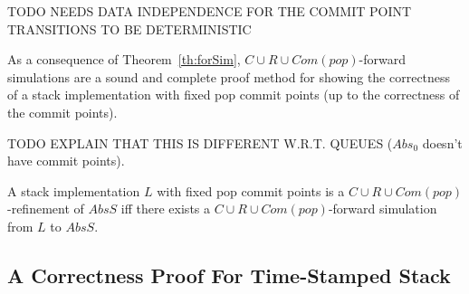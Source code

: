 TODO NEEDS DATA INDEPENDENCE FOR THE COMMIT POINT TRANSITIONS TO BE DETERMINISTIC

As a consequence of Theorem~\ref{th:forSim}, $C\cup R\cup Com(pop)$-forward simulations are a sound and complete proof method for showing the correctness of a stack implementation with fixed pop commit points (up to the correctness of the commit points). 

TODO EXPLAIN THAT THIS IS DIFFERENT W.R.T. QUEUES ($Abs_0$ doesn't have commit points).

\begin{corollary}
A stack implementation $L$ with fixed pop commit points is a $C\cup R\cup Com(pop)$-refinement of $AbsS$ if{f} there exists a $C\cup R\cup Com(pop)$-forward simulation from $L$ to $AbsS$.
\end{corollary}


\subsection{A Correctness Proof For Time-Stamped Stack}





